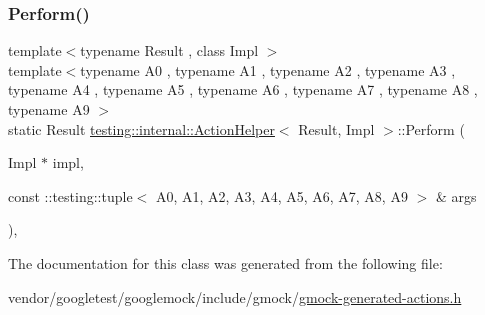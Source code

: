 \mbox{\label{classtesting_1_1internal_1_1_action_helper_adfe6c86332cc09b352ec5ccbad1d3988}} 
\subsubsection{\texorpdfstring{Perform()}{Perform()}\hspace{0.1cm}{\footnotesize\ttfamily [11/11]}}
{\footnotesize\ttfamily template$<$typename Result , class Impl $>$ \\
template$<$typename A0 , typename A1 , typename A2 , typename A3 , typename A4 , typename A5 , typename A6 , typename A7 , typename A8 , typename A9 $>$ \\
static Result \hyperlink{classtesting_1_1internal_1_1_action_helper}{testing\+::internal\+::\+Action\+Helper}$<$ Result, Impl $>$\+::Perform (\begin{DoxyParamCaption}\item[{Impl $\ast$}]{impl,  }\item[{const \+::testing\+::tuple$<$ A0, A1, A2, A3, A4, A5, A6, A7, A8, A9 $>$ \&}]{args }\end{DoxyParamCaption})\hspace{0.3cm}{\ttfamily [inline]}, {\ttfamily [static]}}



The documentation for this class was generated from the following file\+:\begin{DoxyCompactItemize}
\item 
vendor/googletest/googlemock/include/gmock/\hyperlink{gmock-generated-actions_8h}{gmock-\/generated-\/actions.\+h}\end{DoxyCompactItemize}
